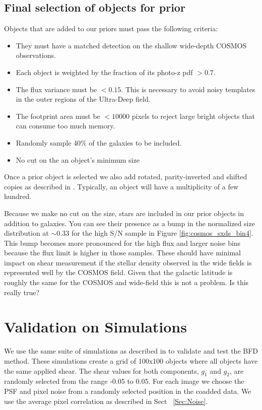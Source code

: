 \documentclass[useAMS,usenatbib]{mnras}
\begin{document}
\subsection{Final selection of objects for prior}
Objects that are added to our priors must pass the following criteria:
\begin{itemize}
\item They must have a matched detection on the shallow wide-depth COSMOS observations.
\item Each object is weighted by the fraction of its photo-z pdf $> 0.7$.
\item The flux variance must be $< 0.15$. This is necessary to avoid noisy templates in the outer regions of the Ultra-Deep field.
\item The footprint area must be $< 10000$ pixels to reject large bright objects that can consume too much memory.
\item Randomly sample 40$\%$ of the galaxies to be included.
\item No cut on the an object's minimum size

\end{itemize}
Once a prior object is selected we also add rotated, parity-inverted and shifted copies as described in \cite{Bernstein2016}.  Typically, an object will have a multiplicity of a few hundred.

Because we make no cut on the size, stars are included in our prior objects in addition to galaxies.  You can see their presence as a bump in the normalized size distribution at $\sim 0.33$ for the high S/N sample in Figure \ref{fig:cosmos_sxds_bin4}.  This bump becomes more pronounced for the high flux and larger noise bins because the flux limit is higher in those samples.  These should have minimal impact on shear measurement if the stellar density observed in the wide fields is represented well by the COSMOS field.  Given that the galactic latitude is roughly the same for the COSMOS and wide-field this is not a problem.  Is this really true?


\section{Validation on Simulations}
\label{Sec:Sims}

We use the same suite of simulations as described in \cite{SimPaper:inprep} to validate and test the BFD method.  These simulations create a grid of 100x100 objects where all objects have the same applied shear.  The shear values for both components, $g_1$ and $g_2$, are randomly selected from the range -0.05 to 0.05.  For each image we choose the PSF and pixel noise from a randomly selected position in the coadded data.  We use the average pixel correlation as described in Sect ~\ref{Sec:Noise}. 
 
\end{document}
